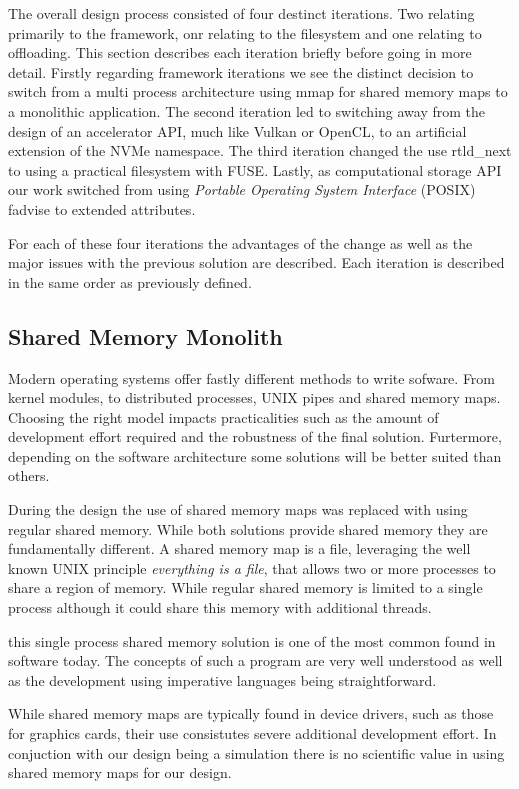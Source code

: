 The overall design process consisted of four destinct iterations. Two relating
primarily to the framework, onr relating to the filesystem and one relating to
offloading. This section describes each iteration briefly before going in more
detail. Firstly regarding framework iterations we see the distinct decision
to switch from a multi process architecture using mmap for shared memory maps to
a monolithic application. The second iteration led to switching away from the
design of an accelerator API, much like Vulkan or OpenCL, to an artificial
extension of the NVMe namespace. The third iteration changed the use
rtld\_next \cite{rtldnext} to using a practical filesystem with FUSE. Lastly, as
computational storage API our work switched from using
\textit{Portable Operating System Interface} (POSIX) fadvise \cite{fadvise} to
extended attributes.

For each of these four iterations the advantages of the change as well as the
major issues with the previous solution are described. Each iteration is
described in the same order as previously defined.

\subsection{Shared Memory Monolith}

Modern operating systems offer fastly different methods to write sofware. From
kernel modules, to distributed processes, UNIX pipes and shared memory maps.
Choosing the right model impacts practicalities such as the amount of
development effort required and the robustness of the final solution. 
Furtermore, depending on the software architecture some solutions will be better
suited than others.

During the design the use of shared memory maps was replaced with using regular
shared memory. While both solutions provide shared memory they are fundamentally
different. A shared memory map is a file, leveraging the well known UNIX
principle \textit{everything is a file}, that allows two or more processes to
share a region of memory. While regular shared memory is limited to a single
process although it could share this memory with additional threads.

this single process shared memory solution is one of the most common found in
software today. The concepts of such a program are very well understood as
well as the development using imperative languages being straightforward.

While shared memory maps are typically found in device drivers, such as those
for graphics cards, their use consistutes severe additional development effort.
In conjuction with our design being a simulation there is no scientific value in
using shared memory maps for our design.

